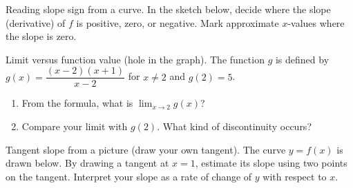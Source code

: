 \documentclass[11pt]{article}
\def\textbf#1{#1}%
\newcounter{question}
\begin{document}
\begin{question}
\textbf{Reading slope sign from a curve.}
In the sketch below, decide where the slope (derivative) of $f$ is positive, zero, or negative. Mark approximate $x$-values where the slope is zero.

\begin{center}
\end{center}
\end{question}

\begin{question}
\textbf{Limit versus function value (hole in the graph).}
The function $g$ is defined by $g(x)=\dfrac{(x-2)(x+1)}{x-2}$ for $x\ne2$ and $g(2)=5$.
\begin{enumerate}
  \item From the formula, what is $\displaystyle\lim_{x\to 2} g(x)$?
  \item Compare your limit with $g(2)$. What kind of discontinuity occurs?
\end{enumerate}
\end{question}

\begin{question}
\textbf{Tangent slope from a picture (draw your own tangent).}
The curve $y=f(x)$ is drawn below. By drawing a tangent at $x=1$, estimate its slope using two points on the tangent. Interpret your slope as a rate of change of $y$ with respect to $x$.

\begin{center}
\end{center}
\end{question}
\end{document}
